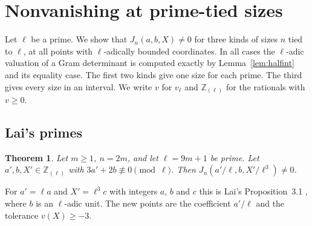 \documentclass[11pt]{amsart}
\newtheorem{theorem}{Theorem}[section]
\theoremstyle{definition}
\theoremstyle{remark}
\numberwithin{equation}{section}
\newcommand{\Z}{\mathbb Z}
\begin{document}
\section{Nonvanishing at prime-tied sizes}\label{sec:nv}

Let $\ell$ be a prime. We show that $J_n(a,b,X)\ne0$ for three kinds of sizes $n$ tied to $\ell$, at all points with
$\ell$-adically bounded coordinates. In all cases the $\ell$-adic valuation of a Gram determinant is computed exactly
by Lemma~\ref{lem:halfint} and its equality case. The first two kinds give one size for each prime. The third gives
every size in an interval. We write $v$ for $v_\ell$ and $\Z_{(\ell)}$ for the rationals with
$v\ge0$.

\subsection{Lai's primes}
\begin{theorem}\label{thm:NV}
Let $m\ge1$, $n=2m$, and let $\ell=9m+1$ be prime. Let $a',b,X'\in\Z_{(\ell)}$ with $3a'+2b\not\equiv0\pmod\ell$. Then
$J_n(a'/\ell,b,X'/\ell^3)\ne0$.
\end{theorem}

For $a'=\ell a$ and $X'=\ell^3c$ with integers $a$, $b$ and $c$ this is Lai's Proposition~3.1 \cite{Lai2026}, where
$b$ is an $\ell$-adic unit.
The new points are the coefficient $a'/\ell$ and the tolerance $v(X)\ge-3$.
\end{document}
